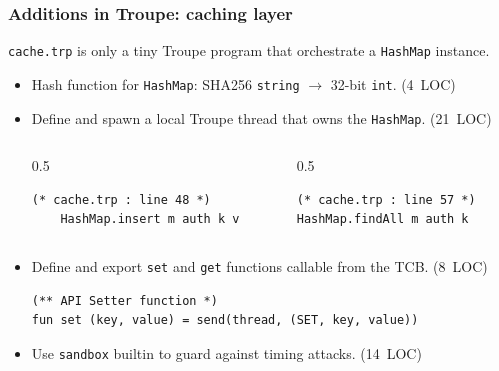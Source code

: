 \documentclass[english, aspectratio=169]{beamer}
\begin{document}
\begin{frame}[fragile]
  \frametitle{Additions in Troupe: caching layer}

  \texttt{cache.trp} is only a tiny Troupe program that orchestrate a
  \texttt{HashMap} instance.
  \begin{itemize}
  \item<2-> Hash function for \texttt{HashMap}: SHA256 \texttt{string}
    $\rightarrow$ 32-bit \texttt{int}. (4~LOC)

  \item<3-> Define and spawn a local Troupe thread that owns the
    \texttt{HashMap}. (21~LOC)

    \begin{columns}
      \begin{column}{0.5\linewidth}
        \begin{lstlisting}[language=troupe, numbers=none]
    (* cache.trp : line 48 *)
    HashMap.insert m auth k v
        \end{lstlisting}
      \end{column}
      \begin{column}{0.5\linewidth}
        \begin{lstlisting}[language=troupe, numbers=none]
(* cache.trp : line 57 *)
HashMap.findAll m auth k
        \end{lstlisting}
      \end{column}
    \end{columns}

  \item<4-> Define and export \texttt{set} and \texttt{get} functions callable
    from the TCB. (8~LOC)

    \begin{lstlisting}[language=troupe, numbers=none]
(** API Setter function *)
fun set (key, value) = send(thread, (SET, key, value))
    \end{lstlisting}

  \item<5-> Use \texttt{sandbox} builtin to guard against timing attacks.
    (14~LOC)
  \end{itemize}
\end{frame}
\end{document}
